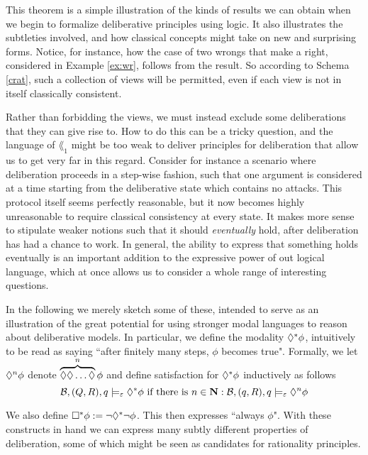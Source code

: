 \documentclass[greybox]{svmult}
\newcommand{\views}{\mathcal B}
\newcommand{\sem}{\varepsilon}
\begin{document}
This theorem is a simple illustration of the kinds of results we can obtain when we begin to formalize deliberative principles using logic. It also illustrates the subtleties involved, and how classical concepts might take on new and surprising forms. Notice, for instance, how the case of two wrongs that make a right, considered in Example \ref{ex:wr}, follows from the result. So according to Schema \ref{crat}, such a collection of views will be permitted, even if each view is not in itself classically consistent.

Rather than forbidding the views, we must instead exclude some deliberations that they can give rise to.
How to do this can be a tricky question, and the language of $\lang_1$ might be too weak to deliver principles for deliberation that allow us to get very far in this regard. Consider for instance a scenario where deliberation proceeds in a step-wise fashion, such that one argument is considered at a time starting from the deliberative state which contains no attacks. This protocol itself seems perfectly reasonable, but it now becomes highly unreasonable to require classical consistency at every state. It makes more sense to stipulate weaker notions such that it should \emph{eventually} hold, after deliberation has had a chance to work. In general, the ability to express that something holds eventually is an important addition to the expressive power of out logical language, which at once allows us to consider a whole range of interesting questions.

In the following we merely sketch some of these, intended to serve as an illustration of the great potential for using stronger modal languages to reason about deliberative models. In particular, we define the modality $\lozenge^\ast \phi$, intuitively to be read as saying ``after finitely many steps, $\phi$ becomes true". Formally, we let $\lozenge^n \phi$ denote $\overbrace{\lozenge \lozenge \ldots \lozenge}^{n} \phi$ and define satisfaction for $\lozenge^\ast \phi$ inductively as follows
\begin{equation}\label{sem:star}
\views,(Q,R),q \models_\sem \adia^\ast\phi \text{ if there is } n \in \mathbf N: \views,(q,R),q\models_\sem \adia^n \phi
\end{equation}

We also define $\square^\ast \phi := \neg \lozenge^\ast \neg \phi$. This then expresses ``always $\phi$". With these constructs in hand we can express many subtly different properties of deliberation, some of which might be seen as candidates for rationality principles.
\end{document}
